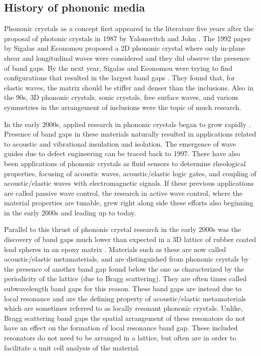 \documentclass{article}
\begin{document}
\subsection{History of phononic media}
Phononic crystals as a concept first appeared in the literature five years 
after the proposal of photonic crystals in 1987 by Yalonovitch and John 
\cite{hussein14}. The 1992 paper by Sigalas and Economou \cite{sigalas92} 
proposed a 2D phononic 
crystal where only in-plane shear and longitudinal waves were considered and 
they did observe the presence of band gaps. By the next year, Sigalas and 
Economou 
were trying to find configurations that resulted in the largest band gaps 
\cite{sigalas93}. They 
found that, for elastic waves, the matrix should be stiffer and denser than the 
inclusions. Also in the 90s, 3D phononic crystals, sonic crystals, free surface 
waves, and various symmetries in the arrangement of inclusions were the topic 
of much research. 

In the early 2000s, applied research in phononic crystals began to grow 
rapidly \cite{hussein14}. Presence of band gaps in these materials naturally 
resulted in 
applications related to acoustic and vibrational insulation and isolation. The 
emergence of wave guides due to defect engineering can be traced back to 1997. 
There have also been applications of phononic crystals as fluid 
sensors to determine rheological properties, focusing of acoustic waves, 
acoustic/elastic logic gates, and coupling of acoustic/elastic waves with 
electromagnetic signals. If these previous applications are called passive wave 
control, the research in active wave control, where the material properties are 
tunable, grew right along side these 
efforts also beginning in the early 2000s and leading up to today.

Parallel to this thrust of phononic crystal research in the early 2000s was the 
discovery of band gaps much lower than expected in a 3D lattice of rubber 
coated lead spheres in an epoxy matrix \cite{liu00}. Materials such as these 
are now called 
acoustic/elastic metamaterials, and are distinguished from phononic crystals by 
the presence of another band gap found below the one as characterized by the 
periodicity of the lattice (due to Bragg scattering). They are often times 
called subwavelength band gaps for this reason. These band gaps are instead due 
to local resonance and are the defining property of acoustic/elastic 
metamaterials which are sometimes referred to as locally resonant phononic 
crystals. Unlike, Bragg scattering band gaps the spatial arrangement of these 
resonators do not have an effect on the formation of local resonance band gap. 
These included resonators do not need to be arranged in a lattice, but often 
are in order to facilitate a unit cell analysis of the material.
\end{document}
